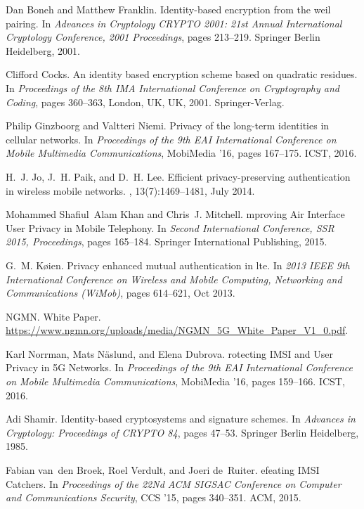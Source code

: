 \documentclass{river-journal}
\begin{document}
\begin{thebibliography}{10}
Dan Boneh and Matthew Franklin.
\newblock Identity-based encryption from the weil pairing.
\newblock In {\em Advances in Cryptology CRYPTO 2001: 21st Annual International
  Cryptology Conference, 2001 Proceedings}, pages 213--219. Springer Berlin
  Heidelberg, 2001.

Clifford Cocks.
\newblock An identity based encryption scheme based on quadratic residues.
\newblock In {\em Proceedings of the 8th IMA International Conference on
  Cryptography and Coding}, pages 360--363, London, UK, UK, 2001.
  Springer-Verlag.

Philip Ginzboorg and Valtteri Niemi.
\newblock Privacy of the long-term identities in cellular networks.
\newblock In {\em Proceedings of the 9th EAI International Conference on Mobile
  Multimedia Communications}, MobiMedia '16, pages 167--175. ICST, 2016.

H.~J. Jo, J.~H. Paik, and D.~H. Lee.
\newblock Efficient privacy-preserving authentication in wireless mobile
  networks.
, 13(7):1469--1481, July
  2014.

Mohammed Shafiul~Alam Khan and Chris~J. Mitchell.
mproving {A}ir {I}nterface {U}ser {P}rivacy in {M}obile
  {T}elephony.
\newblock In {\em Second International Conference, SSR 2015, Proceedings},
  pages 165--184. Springer International Publishing, 2015.

G.~M. K{\o}ien.
\newblock Privacy enhanced mutual authentication in lte.
\newblock In {\em 2013 IEEE 9th International Conference on Wireless and Mobile
  Computing, Networking and Communications (WiMob)}, pages 614--621, Oct 2013.

NGMN.
 {W}hite {P}aper.
\newblock
  \url{https://www.ngmn.org/uploads/media/NGMN_5G_White_Paper_V1_0.pdf}.

Karl Norrman, Mats N\"{a}slund, and Elena Dubrova.
rotecting {IMSI} and {U}ser {P}rivacy in {5G} {N}etworks.
\newblock In {\em Proceedings of the 9th EAI International Conference on Mobile
  Multimedia Communications}, MobiMedia '16, pages 159--166. ICST, 2016.

Adi Shamir.
\newblock Identity-based cryptosystems and signature schemes.
\newblock In {\em Advances in Cryptology: Proceedings of CRYPTO 84}, pages
  47--53. Springer Berlin Heidelberg, 1985.

Fabian van~den Broek, Roel Verdult, and Joeri de~Ruiter.
efeating {IMSI} {C}atchers.
\newblock In {\em Proceedings of the 22Nd ACM SIGSAC Conference on Computer and
  Communications Security}, CCS '15, pages 340--351. ACM, 2015.

\end{thebibliography}
\end{document}
